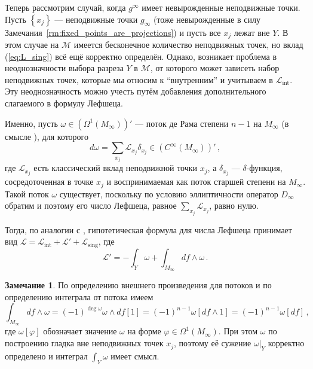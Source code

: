 \documentclass[a4paper, 12pt]{article}
\theoremstyle{definition}
\newtheorem{remark}[theorem]{Замечание}
\begin{document}
Теперь рассмотрим случай, когда \({ g^{\infty} }\) имеет невырожденные неподвижные точки. Пусть \({ \left\{ x_{j} \right\} }\) --- неподвижные точки \({ g_{\infty} }\) (тоже невырожденные в силу Замечания~\ref{rm:fixed_points_are_projections}) и пусть все \({ x_{j} }\) лежат вне \({ Y }\). В этом случае на \({ \mathcal M }\) имеется бесконечное количество неподвижных точек, но вклад (\ref{eq:L_sing}) всё ещё корректно определён. Однако, возникает проблема в неоднозначности выбора разреза \({ Y }\) в \({ \mathcal M }\), от которого может зависеть набор неподвижных точек, которые мы относим к ``внутренним'' и учитываем в \({ \mathcal L_{\operatorname{int}} }\). Эту неоднозначность можно учесть путём добавления дополнительного слагаемого в формулу Лефшеца.

Именно, пусть \({ \omega \in (\Omega^1(M_{\infty}))' }\) --- поток де Рама степени \({ n-1 }\) на \({ M_{\infty} }\) (в смысле \cite[Chapter III]{de2012differentiable}), для которого \[
    d \omega = \sum_{x_{j}} \mathcal L_{x_{j}} \delta_{x_{j}} \in (C^{\infty}(M_{\infty}))'\,,
\] где \({ \mathcal L_{x_{j}} }\) есть классический вклад неподвижной точки \({ x_{j} }\), а \({ \delta_{x_{j}} }\) --- \({ \delta }\)-функция, сосредоточенная в точке \({ x_{j} }\) и воспринимаемая как поток старшей степени на \({ M_{\infty} }\). Такой поток \({ \omega }\) существует, поскольку по условию эллиптичности оператор \({ D_{\infty} }\) обратим и поэтому его число Лефшеца, равное \({ \sum_{x_{j}} \mathcal L_{x_{j}} }\), равно нулю.

Тогда, по аналогии с \cite[Theorem A]{mrowka2016index}, гипотетическая формула для числа Лефшеца принимает вид \({ \mathcal L = \mathcal L_{\operatorname{int}} + \mathcal L' + \mathcal L_{\operatorname{sing}} }\), где \[
    \mathcal L' = -\int_{Y} \omega + \int_{M_{\infty}} df \land \omega\,.
\]

\begin{remark}
    По определению внешнего произведения для потоков и по определению интеграла от потока имеем \[
        \int_{M_{\infty}} df \land \omega = (-1)^{\deg \omega} \omega \land df [1] = (-1)^{n-1} \omega[df \land 1] = (-1)^{n-1} \omega[df]\,,
    \] где \({ \omega[\varphi] }\) обозначает значение \({ \omega }\) на форме \({ \varphi \in \Omega^{1}(M_{\infty}) }\). При этом \({ \omega }\) по построению гладка вне неподвижных точек \({ x_{j} }\), поэтому её сужение \({ \omega |_{Y} }\) корректно определено и интеграл \({ \int_{Y} \omega }\) имеет смысл.
\end{remark}
\end{document}
